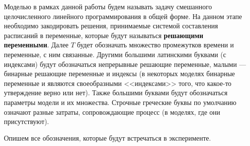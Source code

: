 \documentclass[12pt, twoside]{article}
\theoremstyle{definition}
\begin{document}
Моделью в рамках данной работы будем называть задачу смешанного целочисленного линейного программирования в общей форме. На данном этапе необходимо закодировать решения, принимаемые системой составления расписаний в переменные, которые будут называться \textbf{решающими переменными}. Далее $T$ будет обозначать множество промежутков времени и переменные, с ним связанные. Другими большими латинскими буквами (с индексами) будут обозначаться непрерывные решающие переменные, малыми --- бинарные решающие переменные и индексы (в некоторых моделях бинарные переменные и являются своеобразными <<индексами>> того, что какое-то утверждение верно или нет). Также большими буквами будут обозначаться параметры модели и их множества. Строчные греческие буквы по умолчанию означают разные затраты, сопровождающие процесс (в моделях, где они присутствуют).

Опишем все обозначения, которые будут встречаться в эксперименте.
\end{document}
